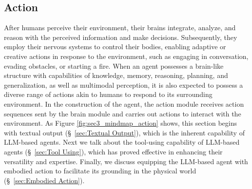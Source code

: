 

\subsection{Action}\label{sec:Action}

After humans perceive their environment, their brains integrate, analyze, and reason with the perceived information and make decisions. 
Subsequently, they employ their nervous systems to control their bodies, enabling adaptive or creative actions in response to the environment, such as engaging in conversation, evading obstacles, or starting a fire. 
When an agent possesses a brain-like structure with capabilities of knowledge, memory, reasoning, planning, and generalization, as well as multimodal perception, it is also expected to possess a diverse range of actions akin to humans to respond to its surrounding environment. In the construction of the agent, the action module receives action sequences sent by the brain module and carries out actions to interact with the environment.
As Figure \ref{fig:sec3_mindmap_action} shows, this section begins with textual output (\S \ \ref{sec:Textual Output}), which is the inherent capability of LLM-based agents. 
Next we talk about the tool-using capability of LLM-based agents (\S \ \ref{sec:Tool Using}), which has proved effective in enhancing their versatility and expertise. 
Finally, we discuss equipping the LLM-based agent with embodied action to facilitate its grounding in the physical world (\S \ \ref{sec:Embodied Action}).


